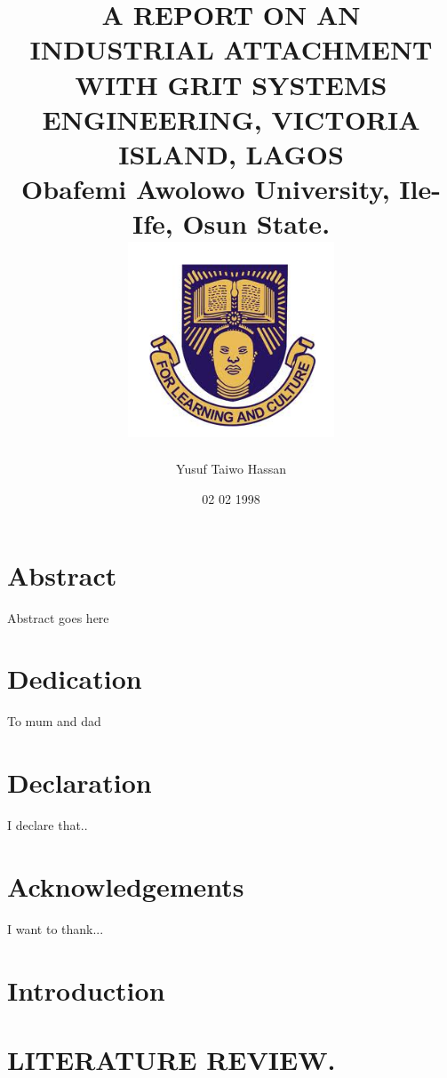 \documentclass[12pt,twoside]{report}
\begin{document}
\title{
A REPORT ON
AN INDUSTRIAL ATTACHMENT WITH
GRIT SYSTEMS ENGINEERING,
VICTORIA ISLAND, LAGOS\\
{\large Obafemi Awolowo University, Ile-Ife, Osun State.}\\
{\includegraphics{university.png}}
}
\author{Yusuf Taiwo Hassan}
\date{02 02 1998}

\maketitle

\chapter*{Abstract}
Abstract goes here
 
\chapter*{Dedication}
To mum and dad
 
\chapter*{Declaration}
I declare that..
 
\chapter*{Acknowledgements}
I want to thank...
 
\tableofcontents




\chapter{Introduction}

 
\chapter{LITERATURE REVIEW.}

 
\end{document}
